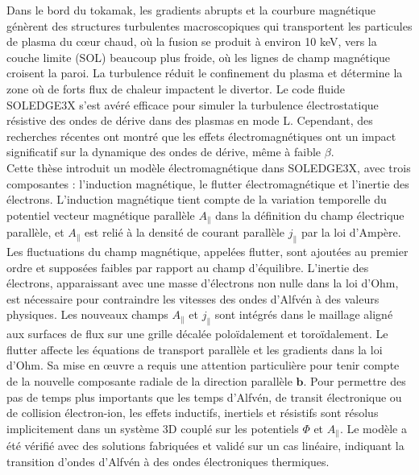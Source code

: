 \label{chap:resume}



Dans le bord du tokamak, les gradients abrupts et la courbure magnétique génèrent des structures turbulentes macroscopiques qui transportent les particules de plasma du cœur chaud, où la fusion se produit à environ 10 keV, vers la couche limite (SOL) beaucoup plus froide, où les lignes de champ magnétique croisent la paroi. La turbulence réduit le confinement du plasma et détermine la zone où de forts flux de chaleur impactent le divertor. Le code fluide SOLEDGE3X s'est avéré efficace pour simuler la turbulence électrostatique résistive des ondes de dérive dans des plasmas en mode L. Cependant, des recherches récentes ont montré que les effets électromagnétiques ont un impact significatif sur la dynamique des ondes de dérive, même à faible $\beta$. \\

Cette thèse introduit un modèle électromagnétique dans SOLEDGE3X, avec trois composantes : l'induction magnétique, le flutter électromagnétique et l'inertie des électrons. L'induction magnétique tient compte de la variation temporelle du potentiel vecteur magnétique parallèle $A_\parallel$ dans la définition du champ électrique parallèle, et $A_\parallel$ est relié à la densité de courant parallèle $j_\parallel$ par la loi d'Ampère. Les fluctuations du champ magnétique, appelées flutter, sont ajoutées au premier ordre et supposées faibles par rapport au champ d'équilibre. L'inertie des électrons, apparaissant avec une masse d'électrons non nulle dans la loi d'Ohm, est nécessaire pour contraindre les vitesses des ondes d'Alfvén à des valeurs physiques. Les nouveaux champs $A_\parallel$ et $j_\parallel$ sont intégrés dans le maillage aligné aux surfaces de flux sur une grille décalée poloïdalement et toroïdalement. Le flutter affecte les équations de transport parallèle et les gradients dans la loi d'Ohm. Sa mise en œuvre a requis une attention particulière pour tenir compte de la nouvelle composante radiale de la direction parallèle $\textbf{b}$. Pour permettre des pas de temps plus importants que les temps d'Alfvén, de transit électronique ou de collision électron-ion, les effets inductifs, inertiels et résistifs sont résolus implicitement dans un système 3D couplé sur les potentiels $\Phi$ et $A_\parallel$. Le modèle a été vérifié avec des solutions fabriquées et validé sur un cas linéaire, indiquant la transition d'ondes d'Alfvén à des ondes électroniques thermiques. \\ 

